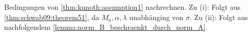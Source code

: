 \begin{Beweis}
Bedingungen von \cref{thm:kunoth:assumption1} nachrechnen.
Zu (i): Folgt aus \cref{thm:schwab09:theorem51}, da $M_{a}, \alpha, \lambda$ unabhänging von $\sigma$.
Zu (ii): Folgt aus nachfolgendem \cref{lemma:norm_B_beschraenkt_durch_norm_A}.
\end{Beweis}







